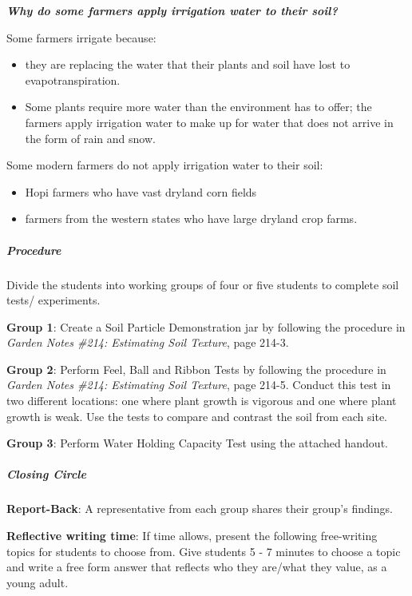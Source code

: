\documentclass[12pt,]{article}
\providecommand{\tightlist}{%
  \setlength{\itemsep}{0pt}\setlength{\parskip}{0pt}}
\let\oldsubparagraph\subparagraph
\renewcommand{\subparagraph}[1]{\oldsubparagraph{#1}\mbox{}}
\begin{document}
\textbf{\emph{Why do some farmers apply irrigation water to their soil? }}

Some farmers irrigate because:

\begin{itemize}
\tightlist
\item
  they are replacing the water that their plants and soil have lost to evapotranspiration.
\item
  Some plants require more water than the environment has to offer; the farmers apply irrigation water to make up for water that does not arrive in the form of rain and snow.
\end{itemize}

Some modern farmers do not apply irrigation water to their soil:

\begin{itemize}
\tightlist
\item
  Hopi farmers who have vast dryland corn fields
\item
  farmers from the western states who have large dryland crop farms.
\end{itemize}

\hypertarget{procedure-2}{%
\subparagraph{Procedure}\label{procedure-2}}

Divide the students into working groups of four or five students to complete soil tests/ experiments.

\textbf{Group 1}: Create a Soil Particle Demonstration jar by following the procedure in \emph{Garden Notes \#214: Estimating Soil Texture}, page 214-3.

\textbf{Group 2}: Perform Feel, Ball and Ribbon Tests by following the procedure in \emph{Garden Notes \#214: Estimating Soil Texture}, page 214-5. Conduct this test in two different locations: one where plant growth is vigorous and one where plant growth is weak. Use the tests to compare and contrast the soil from each site.

\textbf{Group 3}: Perform Water Holding Capacity Test using the attached handout.

\hypertarget{closing-circle-1}{%
\subparagraph{Closing Circle}\label{closing-circle-1}}

\textbf{Report-Back}: A representative from each group shares their group's findings.

\textbf{Reflective writing time}: If time allows, present the following free-writing topics for students to choose from. Give students 5 - 7 minutes to choose a topic and write a free form answer that reflects who they are/what they value, as a young adult.
\end{document}
